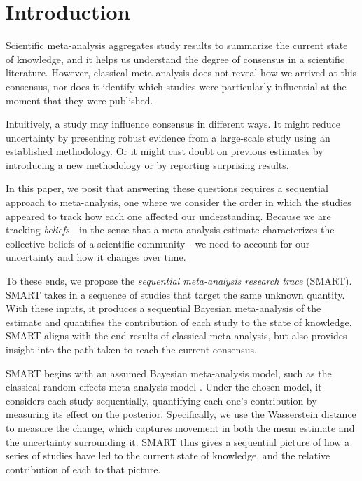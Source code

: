 \section{Introduction}
Scientific meta-analysis aggregates study results to summarize the current state of knowledge, and it helps us understand the degree of consensus in a scientific literature. However, classical meta-analysis does not reveal how we arrived at this consensus, nor does it identify which studies were particularly influential at the moment that they were published.

Intuitively, a study may influence consensus in different ways.  It might reduce uncertainty by presenting robust evidence from a large-scale study using an established methodology. Or it might cast doubt on previous estimates by introducing a new methodology or by reporting surprising results.

In this paper, we posit that answering these questions requires a sequential approach to meta-analysis, one where we consider the order in which the studies appeared to track how each one affected our understanding. Because we are tracking \textit{beliefs}---in the sense that a meta-analysis estimate characterizes the collective beliefs of a scientific community---we need to account for our uncertainty and how it changes over time.

To these ends, we propose the \textit{sequential meta-analysis research trace} (SMART). SMART takes in a sequence of studies that target the same unknown quantity. With these inputs, it produces a sequential Bayesian meta-analysis of the estimate and quantifies the contribution of each study to the state of knowledge. SMART aligns with the end results of classical meta-analysis, but also provides insight into the path taken to reach the current consensus.

SMART begins with an assumed Bayesian meta-analysis model, such as the classical random-effects meta-analysis model \citep{Higgins_Thompson_Spiegelhalter_2009}. Under the chosen model, it considers each study sequentially, quantifying each one's contribution by measuring its effect on the posterior. Specifically, we use the Wasserstein distance \citep{Villani_2008} to measure the change, which captures movement in both the mean estimate and the uncertainty surrounding it. SMART thus gives a sequential picture of how a series of studies have led to the current state of knowledge, and the relative contribution of each to that picture.

